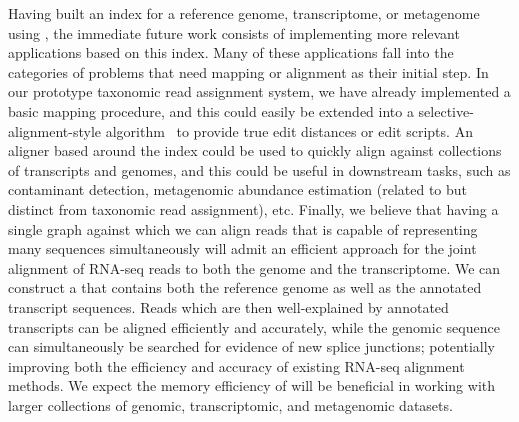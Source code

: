 Having built an index for a reference genome, transcriptome, or metagenome using
\pufferfish, the immediate future work consists of implementing more relevant
applications based on this index. Many of these applications fall into the
categories of problems that need mapping or alignment as their initial step. In
our prototype taxonomic read assignment system, we have already implemented a
basic mapping procedure, and this could easily be extended into a
selective-alignment-style algorithm~\citep{sarkar2017towards} to provide true
edit distances or edit scripts. An aligner based around the \pufferfish index could
be used to quickly align against collections of transcripts and genomes, and
this could be useful in downstream tasks, such as contaminant detection,
metagenomic abundance estimation (related to but distinct from
taxonomic read assignment), etc. Finally, we believe that having a single graph
against which we can align reads that is capable of representing many sequences
simultaneously will admit an efficient approach for the joint alignment of
RNA-seq reads to both the genome and the transcriptome. We can construct a \dbg
that contains both the reference genome as well as the annotated transcript
sequences. Reads which are then well-explained by annotated transcripts can be
aligned efficiently and accurately, while the genomic sequence can
simultaneously be searched for evidence of new splice junctions; potentially
improving both the efficiency and accuracy of existing RNA-seq alignment
methods. We expect the memory efficiency of \pufferfish will be beneficial in
working with larger collections of genomic, transcriptomic, and metagenomic
datasets.
